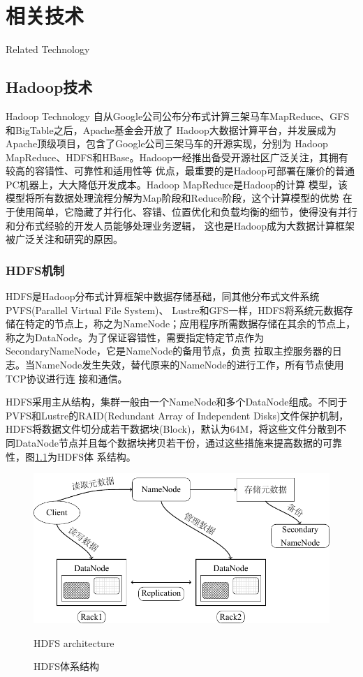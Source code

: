 \chapter{相关技术}{Related Technology}
\section{Hadoop技术}{Hadoop Technology}
自从Google公司公布分布式计算三架马车MapReduce、GFS和BigTable之后，Apache基金会开放了
Hadoop大数据计算平台，并发展成为Apache顶级项目，包含了Google公司三架马车的开源实现，分别为
Hadoop MapReduce、HDFS和HBase。Hadoop一经推出备受开源社区广泛关注，其拥有较高的容错性、可靠性和适用性等
优点，最重要的是Hadoop可部署在廉价的普通PC机器上，大大降低开发成本。Hadoop MapReduce是Hadoop的计算
模型，该模型将所有数据处理流程分解为Map阶段和Reduce阶段\cite{Dean2004MapReduce}，这个计算模型的优势
在于使用简单，它隐藏了并行化、容错、位置优化和负载均衡的细节，使得没有并行和分布式经验的开发人员能够处理业务逻辑，
这也是Hadoop成为大数据计算框架被广泛关注和研究的原因。

\subsection{HDFS机制}

HDFS是Hadoop分布式计算框架中数据存储基础，同其他分布式文件系统PVFS(Parallel Virtual File System)、
Lustre和GFS一样，HDFS将系统元数据存储在特定的节点上，称之为NameNode；应用程序所需数据存储在其余的节点上，
称之为DataNode。为了保证容错性，需要指定特定节点作为SecondaryNameNode，它是NameNode的备用节点，负责
拉取主控服务器的日志。当NameNode发生失效，替代原来的NameNode的进行工作，所有节点使用TCP协议进行连
接和通信\cite{Shvachko2010The}。

HDFS采用主从结构，集群一般由一个NameNode和多个DataNode组成。不同于PVFS和Lustre的RAID(Redundant Array of 
Independent Disks)文件保护机制，HDFS将数据文件切分成若干数据块(Block)，默认为64M，将这些文件分散到不
同DataNode节点并且每个数据块拷贝若干份，通过这些措施来提高数据的可靠性，图\ref{fig:hdfsarchitecture}为HDFS体
系结构。
\begin{figure}
\centering
\includegraphics[width=0.9 \linewidth]{figures/hdfs.pdf}
\caption{HDFS体系结构}{HDFS architecture}
\label{fig:hdfsarchitecture}
\end{figure}

